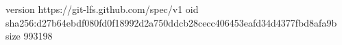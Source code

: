 version https://git-lfs.github.com/spec/v1
oid sha256:d27b64ebdf080fd0f18992d2a750ddcb28cecc406453eafd34d4377fbd8afa9b
size 993198
